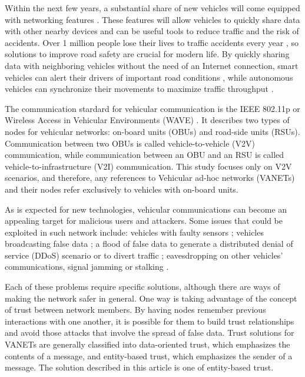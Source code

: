 \documentclass[conference]{IEEEtran}
\begin{document}
Within the next few years, a substantial share of new vehicles will come equipped with networking features \cite{connectedcar2016}.
These features will allow vehicles to quickly share data with other nearby devices and can be useful tools to reduce traffic and the risk of accidents.
Over 1 million people lose their lives to traffic accidents every year \cite{whotraffic}, so solutions to improve road safety are crucial for modern life.
By quickly sharing data with neighboring vehicles without the need of an Internet connection, smart vehicles can alert their drivers of important road conditions \cite{barba2012smart}, while autonomous vehicles can synchronize their movements to maximize traffic throughput \cite{amoozadeh2015platoon}.

The communication stardard for vehicular communication is the IEEE 802.11p or Wireless Access in Vehicular Environments (WAVE) \cite{jiang2008ieee}.
It describes two types of nodes for vehicular networks: on-board units (OBUs) and road-side units (RSUs).
Communication between two OBUs is called vehicle-to-vehicle (V2V) communication, while communication between an OBU and an RSU is called vehicle-to-infrastructure (V2I) communication.
This study focuses only on V2V scenarios, and therefore, any references to Vehicular ad-hoc networks (VANETs) and their nodes refer exclusively to vehicles with on-board units.

As is expected for new technologies, vehicular communications can become an appealing target for malicious users and attackers.
Some issues that could be exploited in such network include: vehicles with faulty sensors \cite{isaac2010security}; vehicles broadcasting false data \cite{golle2004detecting}; a flood of false data to generate a distributed denial of service (DDoS) scenario or to divert traffic \cite{garip2015congestion}; eavesdropping on other vehicles' communications, signal jamming or stalking \cite{isaac2010security}. 

Each of these problems require specific solutions, although there are ways of making the network safer in general.
One way is taking advantage of the concept of trust between network members.
By having nodes remember previous interactions with one another, it is possible for them to build trust relationships and avoid those attacks that involve the spread of false data.
Trust solutions for VANETs are generally classified into data-oriented trust, which emphasizes the contents of a message, and entity-based trust, which emphasizes the sender of a message.
The solution described in this article is one of entity-based trust.
\end{document}

